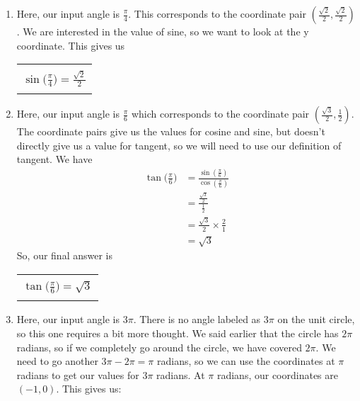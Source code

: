 {\begin{enumerate}
	\item Here, our input angle is $\frac{\pi}{4}$. This corresponds to the coordinate pair $(\frac{\sqrt{2}}{2}, \frac{\sqrt{2}}{2})$. We are interested in the value of sine, so we want to look at the y coordinate. This gives us 
			\begin{center}
		\begin{tabular}{| c |} \hline
			\\[-8pt]
			$\displaystyle \sin{\bigg(\frac{\pi}{4}\bigg)} = \frac{\sqrt{2}}{2}$ \\[-8pt]
			\\\hline
		\end{tabular}
	\end{center}
	\item Here, our input angle is $\frac{\pi}{6}$ which corresponds to the coordinate pair $(\frac{\sqrt{3}}{2}, \frac{1}{2})$. The coordinate pairs give us the values for cosine and sine, but doesn't directly give us a value for tangent, so we will need to use our definition of tangent. We have 
		\begin{equation*}
			\begin{split}
				\tan{\bigg(\frac{\pi}{6}\bigg)} &= \frac{\sin{(\frac{\pi}{6})}}{\cos{(\frac{\pi}{6})}} \\[6pt]
						      &=\frac{\frac{\sqrt{3}}{2}}{\frac{1}{2}} \\[6pt]
						      &= \frac{\sqrt{3}}{2} \times \frac{2}{1} \\[6pt]
						      & = \sqrt{3}
			\end{split}
	\end{equation*}
		So, our final answer is
\drawexampleline
			\begin{center}
		\begin{tabular}{| c |} \hline
			\\[-8pt]
			$\displaystyle \tan{\bigg(\frac{\pi}{6}\bigg)}= \sqrt{3}$ \\[-8pt]
			\\\hline
		\end{tabular}
	\end{center}
	\item Here, our input angle is $3\pi$. There is no angle labeled as $3\pi$ on the unit circle, so this one requires a bit more thought. We said earlier that the circle has $2\pi$ radians, so if we completely go around the circle, we have covered $2\pi$. We need to go another $3\pi-2\pi=\pi$ radians, so we can use the coordinates at $\pi$ radians to get our values for $3\pi$ radians. At $\pi$ radians, our coordinates are $(-1,0)$. This gives us:

\end{enumerate}}
